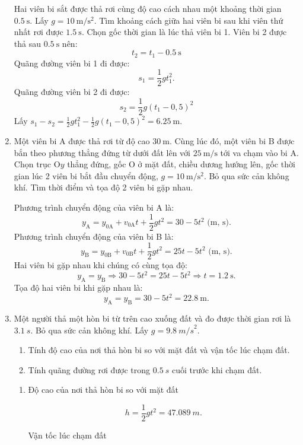 \begin{enumerate}[label=\bfseries Câu \arabic*:]
	
	{
		Hai viên bi sắt được thả rơi cùng độ cao cách nhau một khoảng thời gian $\SI{0,5}{\second}$. Lấy $g = \SI{10}{\meter/\second^2}$. Tìm khoảng cách giữa hai viên bi sau khi viên thứ nhất rơi được $\SI{1,5}{\second}$.
	}
	\hideall
	{	
		Chọn gốc thời gian là lúc thả viên bi 1. Viên bi 2 được thả sau $\SI{0,5}{\second}$ nên:
		$$t_2=t_1-\SI{0,5}{\second}$$
		Quãng đường viên bi 1 đi được:
		$$s_1=\frac{1}{2}gt_1^2.$$
		Quãng đường viên bi 2 đi được:
		$$s_2=\frac{1}{2}g(t_1-0,5)^2$$
		Lấy $s_1-s_2=\frac{1}{2}gt_1^2-\frac{1}{2}g(t_1-0,5)^2=\SI{6,25}{\meter}$.
	}
	\item {}
	
	
	{
		Một viên bi A được thả rơi từ độ cao $\SI{30}{\meter}$. Cùng lúc đó, một viên bi B được bắn theo phương thẳng đứng từ dưới đất lên với $\SI{25}{\meter/\second}$ tới va chạm vào bi A. Chọn trục O$y$ thẳng đứng, gốc O ở mặt đất, chiều dương hướng lên, gốc thời gian lúc 2 viên bi bắt đầu chuyển động, $g=\SI{10}{\meter/\second^2}$. Bỏ qua sức cản không khí. Tìm thời điểm và tọa độ 2 viên bi gặp nhau.
	}
	\hideall
	{	
		
		Phương trình chuyển động của viên bi A là:
		$$y_{\text{A}}=y_{0\text{A}}+v_{0\text{A}}t+\dfrac{1}{2}gt^2=30-5t^2 \textrm{ (m, s)}.$$
		Phương trình chuyển động của viên bi B là:
		$$y_{\text{B}}=y_{0\text{B}}+v_{0\text{B}}t+\dfrac{1}{2}gt^2=25t-5t^2\textrm{ (m, s)}.$$
		Hai viên bi gặp nhau khi chúng có cùng tọa độ:
		$$y_{\text{A}}=y_{\text{B}}\Rightarrow 30-5t^2=25t-5t^2 \Rightarrow t=\SI{1.2}{\second}.$$
		Tọa độ hai viên bi khi gặp nhau là:
		$$y_{\text{A}}=y_{\text{B}}=30-5t^2=\SI{22.8}{\meter}.$$
	}
		\item {}
	
	
	{
		Một người thả một hòn bi từ trên cao xuống đất và đo được thời gian rơi là $\SI{3,1}{s}$. Bỏ qua sức cản không khí. Lấy $g=\SI{9,8}{m/s}^2$.
		\begin{enumerate}[label=\alph*)]
			\item Tính độ cao của nơi thả hòn bi so với mặt đất và vận tốc lúc chạm đất.
			\item Tính quãng đường rơi được trong $\SI{0,5}{s}$ cuối trước khi chạm đất.
		\end{enumerate}
	}
	\hideall
	{	
		\begin{enumerate}[label=\alph*)]
			\item Độ cao của nơi thả hòn bi so với mặt đất 
			
			$$h = \dfrac{1}{2}gt^2 = \SI{47,089}{m}.$$
			
			Vận tốc lúc chạm đất
			

\end{enumerate}}
\end{enumerate}
